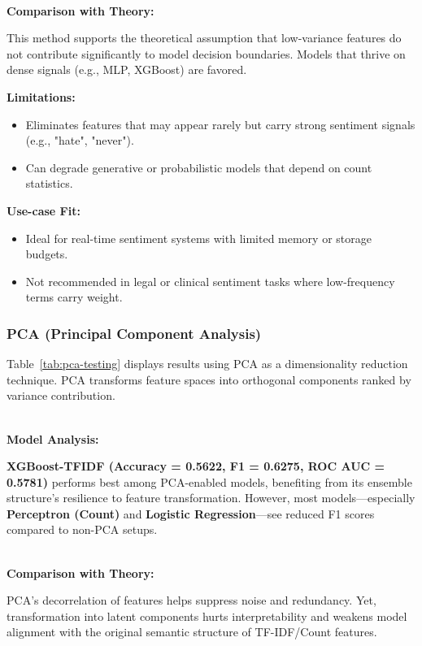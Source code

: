 ${}$\\
\textbf{Comparison with Theory:} 

This method supports the theoretical assumption that low-variance features do not contribute significantly to model decision boundaries. Models that thrive on dense signals (e.g., MLP, XGBoost) are favored.

\textbf{Limitations:}

\begin{itemize}
    \item Eliminates features that may appear rarely but carry strong sentiment signals (e.g., "hate", "never").
    \item Can degrade generative or probabilistic models that depend on count statistics.
\end{itemize}

\textbf{Use-case Fit:}

\begin{itemize}
    \item Ideal for real-time sentiment systems with limited memory or storage budgets.
    \item Not recommended in legal or clinical sentiment tasks where low-frequency terms carry weight.
\end{itemize}

\subsubsection{PCA (Principal Component Analysis)}

Table~\ref{tab:pca-testing} displays results using PCA as a dimensionality reduction technique. PCA transforms feature spaces into orthogonal components ranked by variance contribution.

${}$\\
\textbf{Model Analysis:} 

\textbf{XGBoost-TFIDF (Accuracy = 0.5622, F1 = 0.6275, ROC AUC = 0.5781)} performs best among PCA-enabled models, benefiting from its ensemble structure's resilience to feature transformation. However, most models—especially \textbf{Perceptron (Count)} and \textbf{Logistic Regression}—see reduced F1 scores compared to non-PCA setups.

${}$\\
\textbf{Comparison with Theory:} 

PCA’s decorrelation of features helps suppress noise and redundancy. Yet, transformation into latent components hurts interpretability and weakens model alignment with the original semantic structure of TF-IDF/Count features.

